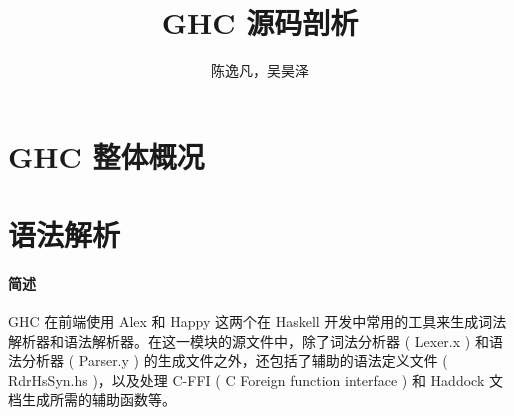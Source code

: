 \documentclass{article}
\author{陈逸凡，吴昊泽}
\title{GHC 源码剖析}
\begin{document}
	\maketitle
	\section{GHC 整体概况}
	\section{语法解析}
	\paragraph{简述}
	GHC 在前端使用 Alex\cite{alex} 和 Happy\cite{happy} 这两个在 Haskell 开发中常用的工具来生成词法解析器和语法解析器。在这一模块的源文件\cite{ghcparser}中，除了词法分析器 ( Lexer.x ) 和语法分析器 ( Parser.y ) 的生成文件之外，还包括了辅助的语法定义文件 ( RdrHsSyn.hs )，以及处理 C-FFI ( C Foreign function interface ) 和 Haddock 文档生成所需的辅助函数等。
\end{document}

